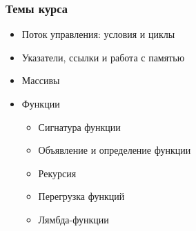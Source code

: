 \documentclass[compress]{beamer}
\begin{document}
\begin{frame}

    \frametitle{Темы курса}

    \begin{itemize}

        \item Поток управления: условия и циклы

        \item Указатели, ссылки и работа с памятью

        \item Массивы

        \item Функции

            \begin{itemize}

                \item Сигнатура функции

                \item Объявление и определение функции

                \item Рекурсия

                \item Перегрузка функций

                \item Лямбда-функции

            \end{itemize}

    \end{itemize}

\end{frame}
\end{document}
